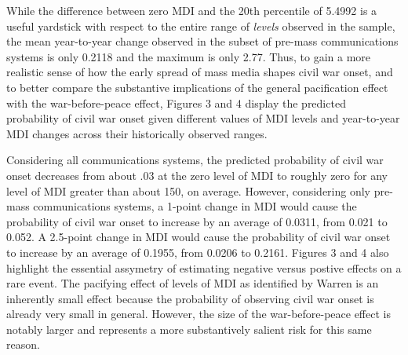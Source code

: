 \documentclass[11pt,article,oneside]{memoir}
\begin{document}
\begin{table}[!htbp]
\end{table}

While the difference between zero MDI and the 20th percentile of 5.4992
is a useful yardstick with respect to the entire range of \emph{levels}
observed in the sample, the mean year-to-year change observed in the
subset of pre-mass communications systems is only 0.2118 and the maximum
is only 2.77. Thus, to gain a more realistic sense of how the early
spread of mass media shapes civil war onset, and to better compare the
substantive implications of the general pacification effect with the
war-before-peace effect, Figures 3 and 4 display the predicted
probability of civil war onset given different values of MDI levels and
year-to-year MDI changes across their historically observed ranges.

Considering all communications systems, the predicted probability of
civil war onset decreases from about .03 at the zero level of MDI to
roughly zero for any level of MDI greater than about 150, on average.
However, considering only pre-mass communications systems, a 1-point
change in MDI would cause the probability of civil war onset to increase
by an average of 0.0311, from 0.021 to 0.052. A 2.5-point change in MDI
would cause the probability of civil war onset to increase by an average
of 0.1955, from 0.0206 to 0.2161. Figures 3 and 4 also highlight the
essential assymetry of estimating negative versus postive effects on a
rare event. The pacifying effect of levels of MDI as identified by
Warren is an inherently small effect because the probability of
observing civil war onset is already very small in general. However, the
size of the war-before-peace effect is notably larger and represents a
more substantively salient risk for this same reason.
\end{document}
